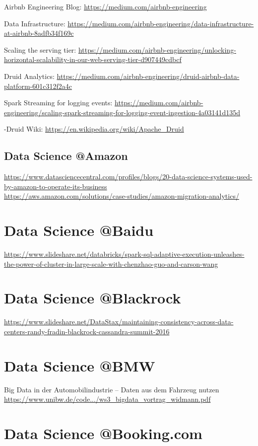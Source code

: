 \documentclass[12pt, numbers=noenddot]{scrreprt} %
\begin{document}
Airbnb Engineering Blog:
\url{https://medium.com/airbnb-engineering}

Data Infrastructure:
\url{https://medium.com/airbnb-engineering/data-infrastructure-at-airbnb-8adfb34f169c}

Scaling the serving tier:
\url{https://medium.com/airbnb-engineering/unlocking-horizontal-scalability-in-our-web-serving-tier-d907449cdbcf}

Druid Analytics:
\url{https://medium.com/airbnb-engineering/druid-airbnb-data-platform-601c312f2a4c}

Spark Streaming for logging events:
\url{https://medium.com/airbnb-engineering/scaling-spark-streaming-for-logging-event-ingestion-4a03141d135d}

-Druid Wiki:
\url{https://en.wikipedia.org/wiki/Apache_Druid}

\subsection{Data Science @Amazon}
\url{https://www.datasciencecentral.com/profiles/blogs/20-data-science-systems-used-by-amazon-to-operate-its-business} \\
\url{https://aws.amazon.com/solutions/case-studies/amazon-migration-analytics/}

\section{Data Science @Baidu}
\url{https://www.slideshare.net/databricks/spark-sql-adaptive-execution-unleashes-the-power-of-cluster-in-large-scale-with-chenzhao-guo-and-carson-wang}

\section{Data Science @Blackrock}
\url{https://www.slideshare.net/DataStax/maintaining-consistency-across-data-centers-randy-fradin-blackrock-cassandra-summit-2016}

\section{Data Science @BMW}
Big Data in der Automobilindustrie – Daten aus dem Fahrzeug nutzen \url{https://www.unibw.de/code.../ws3_bigdata_vortrag_widmann.pdf}

\section{Data Science @Booking.com}
\end{document}
